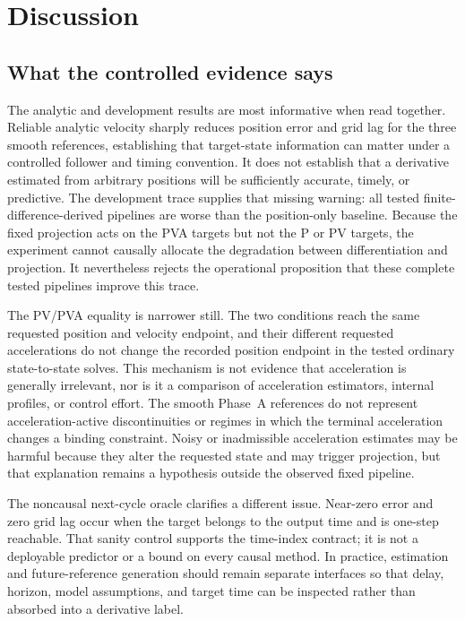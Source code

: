 \section{Discussion}
\label{sec:discussion}

\subsection{What the controlled evidence says}

The analytic and development results are most informative when read together.
Reliable analytic velocity sharply reduces position error and grid lag for the
three smooth references, establishing that target-state information can matter
under a controlled follower and timing convention.  It does not establish
that a derivative estimated from arbitrary positions will be sufficiently
accurate, timely, or predictive.  The development trace supplies that missing
warning: all tested finite-difference-derived pipelines are worse than the
position-only baseline.  Because the fixed projection acts on the PVA targets
but not the P or PV targets, the experiment cannot causally allocate the
degradation between differentiation and projection.  It nevertheless rejects
the operational proposition that these complete tested pipelines improve this
trace.

The PV/PVA equality is narrower still.  The two conditions reach the same
requested position and velocity endpoint, and their different requested
accelerations do not change the recorded position endpoint in the tested
ordinary state-to-state solves.  This mechanism is not evidence that
acceleration is generally irrelevant, nor is it a comparison of acceleration
estimators, internal profiles, or control effort.  The smooth Phase~A
references do not represent acceleration-active discontinuities or regimes in
which the terminal acceleration changes a binding constraint.  Noisy or
inadmissible acceleration estimates may be harmful because they alter the
requested state and may trigger projection, but that explanation remains a
hypothesis outside the observed fixed pipeline.

The noncausal next-cycle oracle clarifies a different issue.  Near-zero error
and zero grid lag occur when the target belongs to the output time and is
one-step reachable.  That sanity control supports the time-index contract; it
is not a deployable predictor or a bound on every causal method.  In practice,
estimation and future-reference generation should remain separate interfaces
so that delay, horizon, model assumptions, and target time can be inspected
rather than absorbed into a derivative label.

